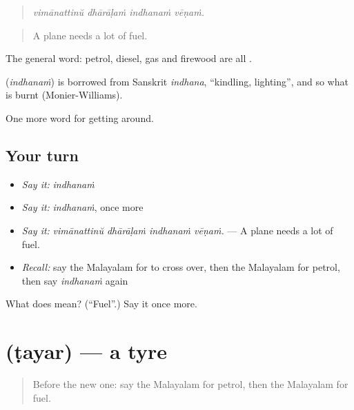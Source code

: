 \begin{quote}
\emph{vimānattinŭ dhārāḷaṁ indhanaṁ vēṇaṁ.}
\end{quote}

\begin{quote}
A plane needs a lot of fuel.
\end{quote}

The general word: petrol, diesel, gas and firewood are all .

\begin{cousinweb}
\textbf{} (\emph{indhanaṁ}) is borrowed from Sanskrit \emph{indhana}, \textquotedblleft{}kindling, lighting\textquotedblright{}, and so what is burnt (Monier-Williams).
\end{cousinweb}

\begin{grammarlens}[title={What you've built}]
One more word for getting around.
\end{grammarlens}

\subsection*{Your turn}
\begin{itemize}
\raggedright
  \item \emph{Say it:} \emph{indhanaṁ}
  \item \emph{Say it:} \emph{indhanaṁ}, once more
  \item \emph{Say it:} \emph{vimānattinŭ dhārāḷaṁ indhanaṁ vēṇaṁ.} — A plane needs a lot of fuel.
  \item \emph{Recall:} say the Malayalam for to cross over, then the Malayalam for petrol, then say \emph{indhanaṁ} again
\end{itemize}

\begin{tcolorbox}[breakable,colback=teal!4,colframe=teal!35!black,title={Before you move on}]
What does  mean? (\textquotedblleft{}Fuel\textquotedblright{}.) Say it once more.
\end{tcolorbox}
\section[\texorpdfstring{\ml{ടയർ} (ṭayar)}{ടയർ (ṭayar)}]{ (ṭayar) — a tyre}

\label{lesson:ML-C470-tayar}



\begin{quote}
Before the new one: say the Malayalam for petrol, then the Malayalam for fuel.
\end{quote}

